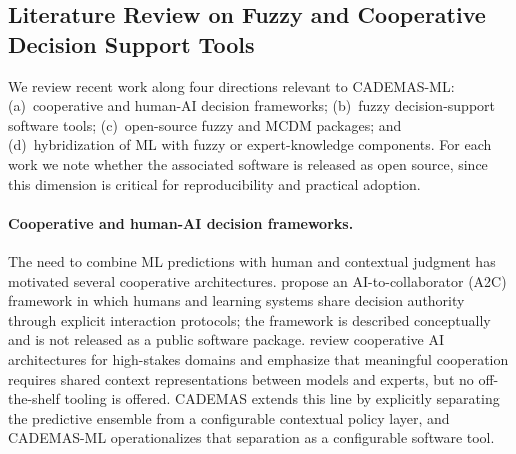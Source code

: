 \subsection{Literature Review on Fuzzy and Cooperative Decision Support Tools}
\label{sec:related}

We review recent work along four directions relevant to CADEMAS-ML: (a)~cooperative and
human-AI decision frameworks; (b)~fuzzy decision-support software tools; (c)~open-source fuzzy
and MCDM packages; and (d)~hybridization of ML with fuzzy or expert-knowledge components.
For each work we note whether the associated software is released as open source, since this
dimension is critical for reproducibility and practical adoption.

\paragraph{Cooperative and human-AI decision frameworks.}
The need to combine ML predictions with human and contextual judgment has motivated several
cooperative architectures. \citet{tariq2024a2c} propose an AI-to-collaborator (A2C) framework
in which humans and learning systems share decision authority through explicit interaction
protocols; the framework is described conceptually and is not released as a public software
package. \citet{varga2023cooperative} review cooperative AI architectures for high-stakes
domains and emphasize that meaningful cooperation requires shared context representations
between models and experts, but no off-the-shelf tooling is offered. CADEMAS
\citep{novoa2026cademas} extends this line by explicitly separating the predictive ensemble
from a configurable contextual policy layer, and CADEMAS-ML operationalizes that separation
as a configurable software tool.

